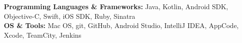 

\begin{cvparagraph}

\textbf{Programming Languages \& Frameworks:} Java, Kotlin, Android SDK, Objective-C, Swift, iOS SDK, Ruby, Sinatra
\\[2pt]
\textbf{OS \& Tools:} Mac OS, git, GitHub, Android Studio, IntelliJ IDEA, AppCode, Xcode, TeamCity, Jenkins


\end{cvparagraph}
